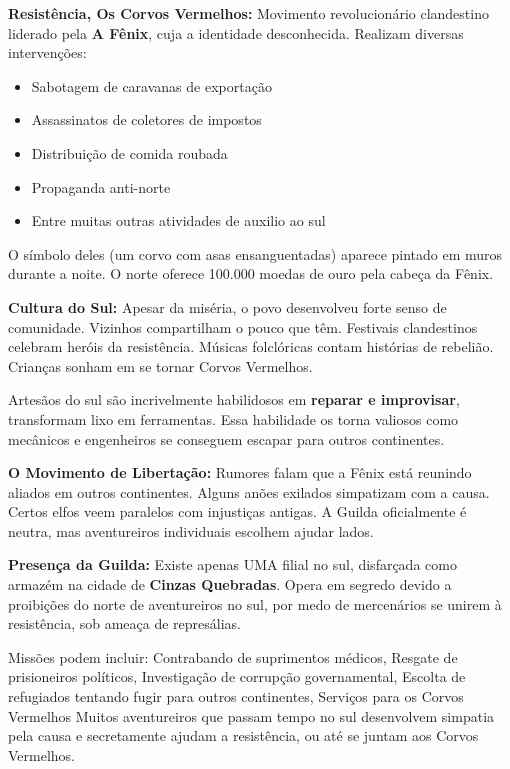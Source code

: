 \textbf{\ringmfamily Resistência, Os Corvos Vermelhos:}
Movimento revolucionário clandestino liderado pela \textbf{A Fênix}, cuja a identidade desconhecida. Realizam diversas intervenções:
\begin{itemize}
    \item Sabotagem de caravanas de exportação
    \item Assassinatos de coletores de impostos
    \item Distribuição de comida roubada
    \item Propaganda anti-norte
    \item Entre muitas outras atividades de auxilio ao sul
\end{itemize}
O símbolo deles (um corvo com asas ensanguentadas) aparece pintado em muros durante a noite. O norte oferece 100.000 moedas de ouro pela cabeça da Fênix.

\textbf{\ringmfamily Cultura do Sul:}
Apesar da miséria, o povo desenvolveu forte senso de comunidade. Vizinhos compartilham o pouco que têm. Festivais clandestinos celebram heróis da resistência. Músicas folclóricas contam histórias de rebelião. Crianças sonham em se tornar Corvos Vermelhos.

Artesãos do sul são incrivelmente habilidosos em \textbf{reparar e improvisar}, transformam lixo em ferramentas. Essa habilidade os torna valiosos como mecânicos e engenheiros se conseguem escapar para outros continentes.

\textbf{\ringmfamily O Movimento de Libertação:}
Rumores falam que a Fênix está reunindo aliados em outros continentes. Alguns anões exilados simpatizam com a causa. Certos elfos veem paralelos com injustiças antigas. A Guilda oficialmente é neutra, mas aventureiros individuais escolhem ajudar lados.

\textbf{\ringmfamily Presença da Guilda:}
Existe apenas UMA filial no sul, disfarçada como armazém na cidade de \textbf{Cinzas Quebradas}. Opera em segredo devido a proibições do norte de aventureiros no sul, por medo de mercenários se unirem à resistência, sob ameaça de represálias.

Missões podem incluir: Contrabando de suprimentos médicos, Resgate de prisioneiros políticos, Investigação de corrupção governamental, Escolta de refugiados tentando fugir para outros continentes, Serviços para os Corvos Vermelhos
Muitos aventureiros que passam tempo no sul desenvolvem simpatia pela causa e secretamente ajudam a resistência, ou até se juntam aos Corvos Vermelhos.

